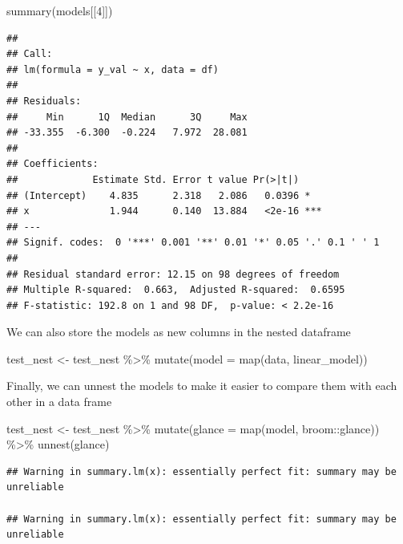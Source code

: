 \documentclass[
]{book}
\newenvironment{Shaded}{\begin{snugshade}}{\end{snugshade}}
\newcommand{\AttributeTok}[1]{\textcolor[rgb]{0.77,0.63,0.00}{#1}}
\newcommand{\DecValTok}[1]{\textcolor[rgb]{0.00,0.00,0.81}{#1}}
\newcommand{\FunctionTok}[1]{\textcolor[rgb]{0.00,0.00,0.00}{#1}}
\newcommand{\NormalTok}[1]{#1}
\newcommand{\OtherTok}[1]{\textcolor[rgb]{0.56,0.35,0.01}{#1}}
\newcommand{\SpecialCharTok}[1]{\textcolor[rgb]{0.00,0.00,0.00}{#1}}
\begin{document}
\begin{Shaded}
\begin{Highlighting}[]
\FunctionTok{summary}\NormalTok{(models[[}\DecValTok{4}\NormalTok{]])}
\end{Highlighting}
\end{Shaded}

\begin{verbatim}
## 
## Call:
## lm(formula = y_val ~ x, data = df)
## 
## Residuals:
##     Min      1Q  Median      3Q     Max 
## -33.355  -6.300  -0.224   7.972  28.081 
## 
## Coefficients:
##             Estimate Std. Error t value Pr(>|t|)    
## (Intercept)    4.835      2.318   2.086   0.0396 *  
## x              1.944      0.140  13.884   <2e-16 ***
## ---
## Signif. codes:  0 '***' 0.001 '**' 0.01 '*' 0.05 '.' 0.1 ' ' 1
## 
## Residual standard error: 12.15 on 98 degrees of freedom
## Multiple R-squared:  0.663,  Adjusted R-squared:  0.6595 
## F-statistic: 192.8 on 1 and 98 DF,  p-value: < 2.2e-16
\end{verbatim}

We can also store the models as new columns in the nested dataframe

\begin{Shaded}
\begin{Highlighting}[]
\NormalTok{test\_nest }\OtherTok{\textless{}{-}}\NormalTok{ test\_nest }\SpecialCharTok{\%\textgreater{}\%} 
  \FunctionTok{mutate}\NormalTok{(}\AttributeTok{model =} \FunctionTok{map}\NormalTok{(data, linear\_model))}
\end{Highlighting}
\end{Shaded}

Finally, we can unnest the models to make it easier to compare them with each other in a data frame

\begin{Shaded}
\begin{Highlighting}[]
\NormalTok{test\_nest }\OtherTok{\textless{}{-}}\NormalTok{ test\_nest }\SpecialCharTok{\%\textgreater{}\%} 
  \FunctionTok{mutate}\NormalTok{(}\AttributeTok{glance =} \FunctionTok{map}\NormalTok{(model, broom}\SpecialCharTok{::}\NormalTok{glance)) }\SpecialCharTok{\%\textgreater{}\%} 
  \FunctionTok{unnest}\NormalTok{(glance)}
\end{Highlighting}
\end{Shaded}

\begin{verbatim}
## Warning in summary.lm(x): essentially perfect fit: summary may be unreliable

## Warning in summary.lm(x): essentially perfect fit: summary may be unreliable
\end{verbatim}
\end{document}
